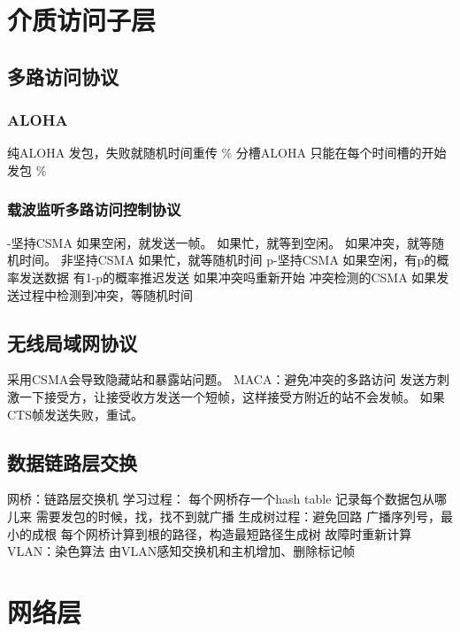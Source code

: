\documentclass{ctexart}
\begin{document}
\section{介质访问子层}
\subsection{多路访问协议}
\subsubsection{ALOHA}
\begin{outline}
    \1 纯ALOHA
        \2 发包，失败就随机时间重传
        \%
    \1 分槽ALOHA
        \2 只能在每个时间槽的开始发包
        \%
\end{outline}
\subsubsection{载波监听多路访问控制协议}
\begin{outline}
    -坚持CSMA
        \2 如果空闲，就发送一帧。
        \2 如果忙，就等到空闲。
        \2 如果冲突，就等随机时间。
    \1 非坚持CSMA
        \2 如果忙，就等随机时间
    \1 p-坚持CSMA
        \2 如果空闲，有p的概率发送数据
        \2 有1-p的概率推迟发送
        \2 如果冲突吗重新开始
    \1 冲突检测的CSMA
        \2 如果发送过程中检测到冲突，等随机时间

\end{outline}

\subsection{无线局域网协议}
\begin{outline}
    \1 采用CSMA会导致隐藏站和暴露站问题。
    \1 MACA：避免冲突的多路访问
        \2 发送方刺激一下接受方，让接受收方发送一个短帧，这样接受方附近的站不会发帧。
        \2 如果CTS帧发送失败，重试。
\end{outline}
\subsection{数据链路层交换}
\begin{outline}
    \1 网桥：链路层交换机
    \1 学习过程：
        \2 每个网桥存一个hash table
        \2 记录每个数据包从哪儿来
        \2 需要发包的时候，找，找不到就广播
    \1 生成树过程：避免回路
        \2 广播序列号，最小的成根
        \2 每个网桥计算到根的路径，构造最短路径生成树
        \2 故障时重新计算
    \1 VLAN：染色算法
        \2 由VLAN感知交换机和主机增加、删除标记帧
\end{outline}

\section{网络层}
\end{document}

